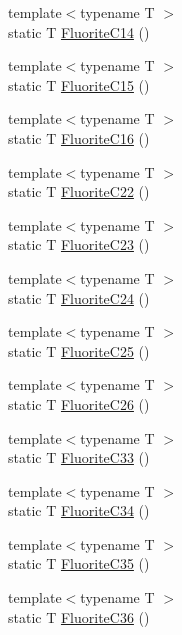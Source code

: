 \begin{DoxyCompactItemize}
{\footnotesize template$<$typename T $>$ }\\static T \mbox{\hyperlink{namespacempc_1_1data_a706fc17cd2266416fc8713f908b0c087}{Fluorite\+C14}} ()
\item 
{\footnotesize template$<$typename T $>$ }\\static T \mbox{\hyperlink{namespacempc_1_1data_adc34a2eb4f5d14f478baa0ae397314d6}{Fluorite\+C15}} ()
\item 
{\footnotesize template$<$typename T $>$ }\\static T \mbox{\hyperlink{namespacempc_1_1data_a12d296d9931fbb5a94b9d4f097b96071}{Fluorite\+C16}} ()
\item 
{\footnotesize template$<$typename T $>$ }\\static T \mbox{\hyperlink{namespacempc_1_1data_ad9e0a89ea7bfcd8a5c59b0991e55fa31}{Fluorite\+C22}} ()
\item 
{\footnotesize template$<$typename T $>$ }\\static T \mbox{\hyperlink{namespacempc_1_1data_af0554787559be379a6e539a2fa1786bb}{Fluorite\+C23}} ()
\item 
{\footnotesize template$<$typename T $>$ }\\static T \mbox{\hyperlink{namespacempc_1_1data_a2895ec2baf206f55b15eedc4086569be}{Fluorite\+C24}} ()
\item 
{\footnotesize template$<$typename T $>$ }\\static T \mbox{\hyperlink{namespacempc_1_1data_aa49cbd913f61fd76806da17a84b3a66c}{Fluorite\+C25}} ()
\item 
{\footnotesize template$<$typename T $>$ }\\static T \mbox{\hyperlink{namespacempc_1_1data_a61d7b717b2a87c05f67a1fd6d6dfb848}{Fluorite\+C26}} ()
\item 
{\footnotesize template$<$typename T $>$ }\\static T \mbox{\hyperlink{namespacempc_1_1data_afbf1246c248616bc0bf03b91ac749c9c}{Fluorite\+C33}} ()
\item 
{\footnotesize template$<$typename T $>$ }\\static T \mbox{\hyperlink{namespacempc_1_1data_a4023047632efbf412ca65cb91637dd8f}{Fluorite\+C34}} ()
\item 
{\footnotesize template$<$typename T $>$ }\\static T \mbox{\hyperlink{namespacempc_1_1data_a34dec5be9da7baa3293f5063ff28a57d}{Fluorite\+C35}} ()
\item 
{\footnotesize template$<$typename T $>$ }\\static T \mbox{\hyperlink{namespacempc_1_1data_a6d4e736077f3a06119f1e1c19de1831f}{Fluorite\+C36}} ()

\end{DoxyCompactItemize}

